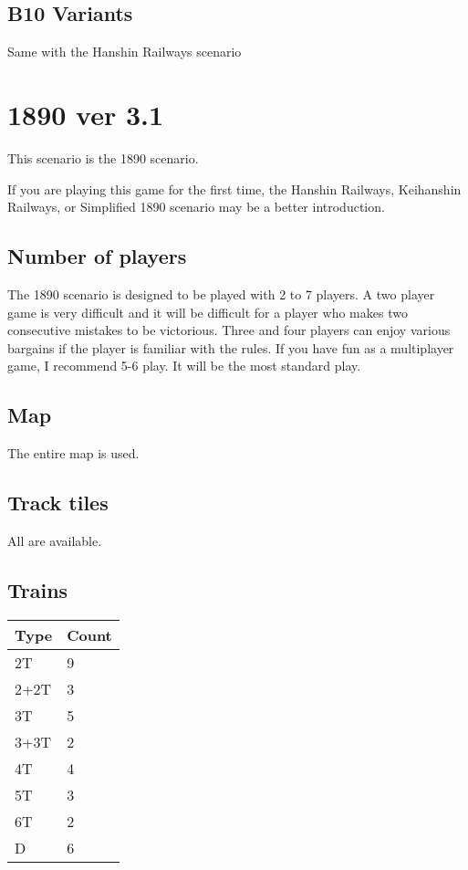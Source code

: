 \documentclass{article}
\begin{document}
\begin{CJK}{UTF8}{min}
\begin{multicols}{2}
\subsection{B10 Variants}
Same with the Hanshin Railways scenario

\newpage
\section{1890 ver 3.1}

This scenario is the 1890 scenario.

If you are playing this game for the first time, the Hanshin Railways,
Keihanshin Railways, or Simplified 1890 scenario may be a better
introduction.

\subsection{Number of players}

The 1890 scenario is designed to be played with 2 to 7 players. A two
player game is very difficult and it will be difficult for a player
who makes two consecutive mistakes to be victorious. Three and four
players can enjoy various bargains if the player is familiar with the
rules. If you have fun as a multiplayer game, I recommend 5-6 play. It
will be the most standard play.

\subsection{Map}

The entire map is used.

\subsection{Track tiles}

All are available.

\subsection{Trains}

\begin{tabular}{ll}
Type & Count \\
\hline
2T & 9\\
2+2T & 3\\
3T & 5 \\
3+3T & 2 \\
4T & 4 \\
5T & 3 \\
6T & 2 \\
D & 6
\end{tabular}


\end{multicols}
\end{CJK}
\end{document}
